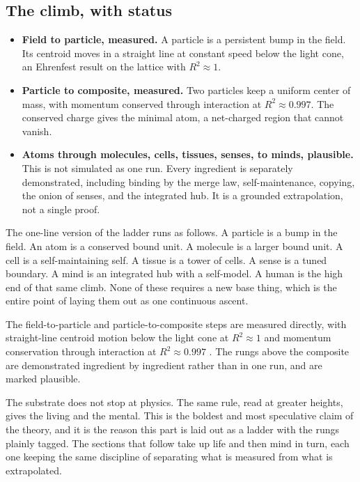 \subsection{The climb, with status}

\begin{itemize}
  \item \textbf{Field to particle, measured.} A particle is a persistent bump in the field. Its centroid moves in a straight line at constant speed below the light cone, an Ehrenfest result on the lattice with $R^2 \approx 1$.
  \item \textbf{Particle to composite, measured.} Two particles keep a uniform center of mass, with momentum conserved through interaction at $R^2 \approx 0.997$. The conserved charge gives the minimal atom, a net-charged region that cannot vanish.
  \item \textbf{Atoms through molecules, cells, tissues, senses, to minds, plausible.} This is not simulated as one run. Every ingredient is separately demonstrated, including binding by the merge law, self-maintenance, copying, the onion of senses, and the integrated hub. It is a grounded extrapolation, not a single proof.
\end{itemize}

The one-line version of the ladder runs as follows. A particle is a bump in the field. An atom is a conserved bound unit. A molecule is a larger bound unit. A cell is a self-maintaining self. A tissue is a tower of cells. A sense is a tuned boundary. A mind is an integrated hub with a self-model. A human is the high end of that same climb. None of these requires a new base thing, which is the entire point of laying them out as one continuous ascent.

\begin{result}
The field-to-particle and particle-to-composite steps are measured directly, with straight-line centroid motion below the light cone at $R^2 \approx 1$ and momentum conservation through interaction at $R^2 \approx 0.997$ \cite{pollard2026vibetest}. The rungs above the composite are demonstrated ingredient by ingredient rather than in one run, and are marked plausible.
\end{result}

The substrate does not stop at physics. The same rule, read at greater heights, gives the living and the mental. This is the boldest and most speculative claim of the theory, and it is the reason this part is laid out as a ladder with the rungs plainly tagged. The sections that follow take up life and then mind in turn, each one keeping the same discipline of separating what is measured from what is extrapolated.
